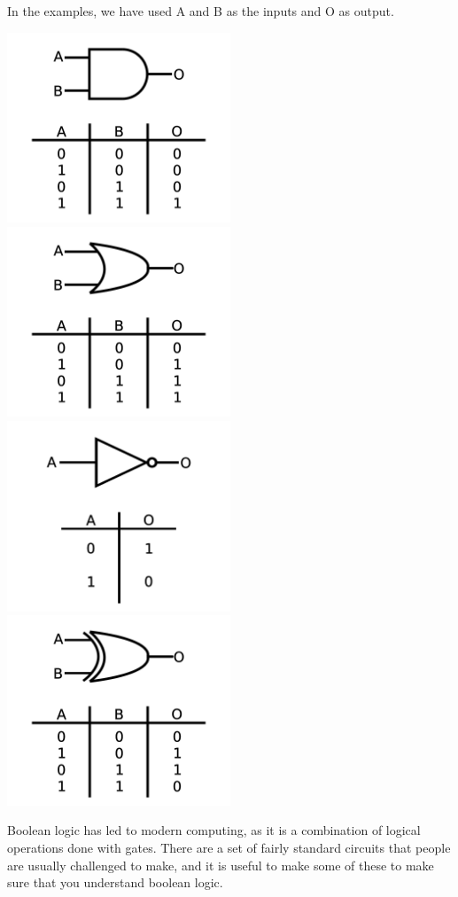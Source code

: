 \documentclass[a4paper,11pt]{report}
\begin{document}
In the examples, we have used A and B as the inputs and O as output.

\includegraphics[width=0.5\textwidth]{andgate1}
\includegraphics[width=0.5\textwidth]{orgate1}
\includegraphics[width=0.5\textwidth]{notgate1}
\includegraphics[width=0.5\textwidth]{xorgate1}

Boolean logic has led to modern computing, as it is a combination of logical operations done with gates. There are a set of fairly standard circuits that people are usually challenged to make, and it is useful to make some of these to make sure that you understand boolean logic.
\end{document}
